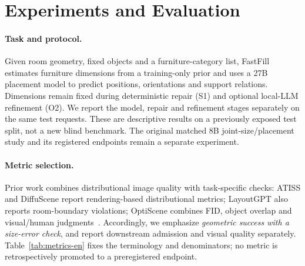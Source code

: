 \section*{Experiments and Evaluation}

\paragraph{Task and protocol.}
Given room geometry, fixed objects and a furniture-category list, FastFill estimates furniture dimensions from a training-only prior and uses a 27B placement model to predict positions, orientations and support relations. Dimensions remain fixed during deterministic repair (S1) and optional local-LLM refinement (O2). We report the model, repair and refinement stages separately on the same \NumRooms{} test requests. These are descriptive results on a previously exposed test split, not a new blind benchmark. The original matched 8B joint-size/placement study and its registered endpoints remain a separate experiment.

\paragraph{Metric selection.}
Prior work combines distributional image quality with task-specific checks: ATISS and DiffuScene report rendering-based distributional metrics; LayoutGPT also reports room-boundary violations; OptiScene combines FID, object overlap and visual/human judgments~\cite{atiss2021,diffuscene2024,layoutgpt2023,optiscene2025}. Accordingly, we emphasize \emph{geometric success with a size-error check}, and report downstream admission and visual quality separately. Table~\ref{tab:metrics-en} fixes the terminology and denominators; no metric is retrospectively promoted to a preregistered endpoint.

